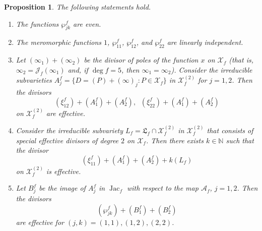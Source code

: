 \documentclass{amsart}
\numberwithin{equation}{section}
\newtheorem{proposition}[theorem]{Proposition}
\theoremstyle{definition}
\theoremstyle{remark}
\DeclareMathOperator{\Jac}{Jac}
\begin{document}
	\begin{proposition}\label{propPropertiesOfP}
		The following statements hold.
		\begin{enumerate}[label=(\roman*)]
			\item\label{ppi} The functions $\wp_{jk}^f$ are even. 
			\item\label{ppii} The meromorphic functions $1$, $\wp_{11}^f$, $\wp_{12}^f$, and $\wp_{22}^f$ are linearly independent.
			\item\label{ppiii} Let $(\infty_1) + (\infty_2)$ be the divisor of poles of the function $x$ on $\mathcal X_f$ (that is, $\infty_2 = \mathscr J_f(\infty_1)$ and, if $\deg f = 5$, then $\infty_1 = \infty_2$). Consider the irreducible subvarieties $A^f_j = \{D = (P) + (\infty)_j: P \in \mathcal X_f\}$ in $\mathcal X_f^{(2)}$ for $j = 1,2$. Then the divisors
			\[
			(\xi^f_{12}) + (A^f_1) + (A^f_2),\;\;(\xi_{22}^f) + (A^f_1) + (A^f_2)
			\]
			on $\mathcal X_f^{(2)}$ are effective.
			\item\label{ppiv} Consider the irreducible subvariety $L_f = \mathfrak L_f \cap \mathcal X_f^{(2)}$ in $\mathcal X_f^{(2)}$ that consists of special effective divisors of degree $2$ on $\mathcal X_f$. Then there exists $k \in \mathbb N$ such that the divisor
			\[(\xi_{11}^f) + (A^f_1) + (A^f_2) + k(L_f)\]
			on $\mathcal X_f^{(2)}$ is effective.
			\item\label{ppv} Let $B^f_j$ be the image of $A^f_j$ in $\Jac_f$ with respect to the map $\mathscr A_f$, $j = 1,2$. Then the divisors
			\[
			(\wp_{jk}^f) + (B^f_1) + (B^f_2)
			\]
			are effective for $(j,k) = (1,1),(1,2),(2,2)$.
		\end{enumerate}
	\end{proposition}
\end{document}

